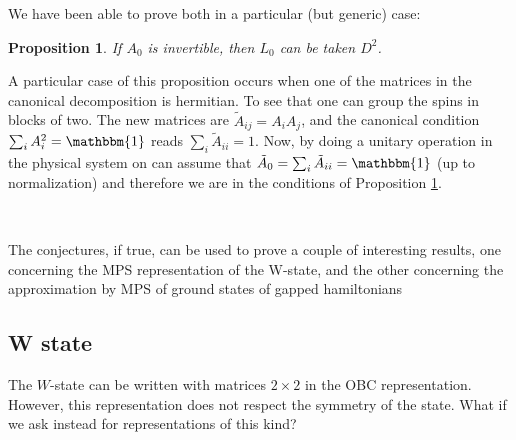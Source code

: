 \documentclass[aps,prl,epsfig,graphics,floatfix,mathbbm,a4paper]{article}
\newtheorem{prop}{\indent Proposition}
\newcommand{\1}{\mathbbm{1}}
\renewcommand{\>}{\rangle}
\newcommand{\<}{\langle}
\begin{document}
We have been able to prove both in a particular (but generic)
case:

\begin{prop}\label{prop:appendix}
    If $A_0$ is invertible, then $L_0$ can be taken $D^2$.
\end{prop}


A particular case of this proposition occurs when one of the
matrices in the canonical decomposition is hermitian. To see that
one can group the spins in blocks of two. The new matrices are
$\tilde{A}_{ij}=A_iA_j$, and the canonical condition $\sum_i
    A_i^2=\1$ reads $\sum_i \tilde{A}_{ii}=1$. Now, by doing a unitary
operation in the physical system on can assume that
$\tilde{A}_0=\sum_i \tilde{A}_{ii} =\1$ (up to normalization) and
therefore we are in the conditions of Proposition
\ref{prop:appendix}.

\

The conjectures, if true, can be used to prove a couple of
interesting results, one concerning the MPS representation of the
W-state, and the other concerning the approximation by MPS of
ground states of gapped hamiltonians


\subsection{W state}

The $W$-state can be written with matrices $2\times 2$ in the OBC
representation. However, this representation does not respect the
symmetry of the state. What if we ask instead for representations
of this kind?
\end{document}
